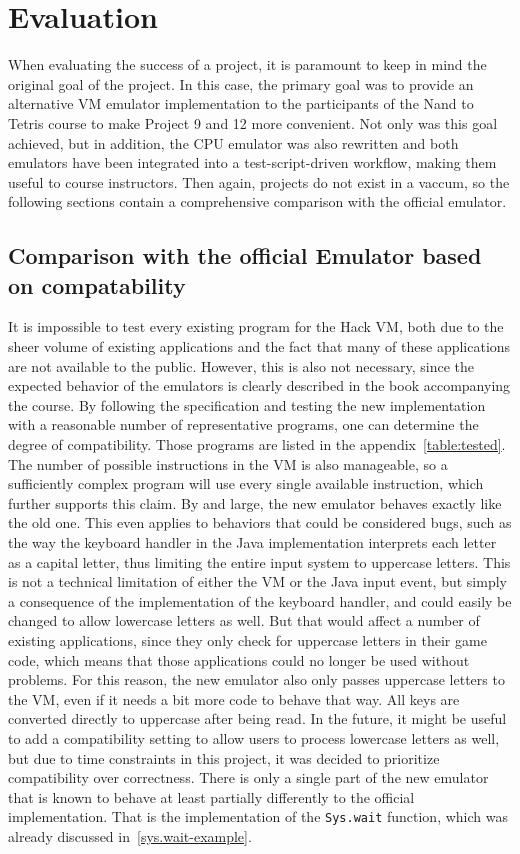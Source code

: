 \section{Evaluation} \label{evaluation}
When evaluating the success of a project, it is paramount to keep in mind the original goal of the project.
In this case, the primary goal was to provide an alternative VM emulator implementation to the participants of the Nand to Tetris course to make Project 9 and 12 more convenient.
Not only was this goal achieved, but in addition, the CPU emulator was also rewritten and both emulators have been integrated into a test-script-driven workflow, making them useful to course instructors.
Then again, projects do not exist in a vaccum, so the following sections contain a comprehensive comparison with the official emulator.

\subsection{Comparison with the official Emulator based on compatability} \label{compatibility}
It is impossible to test every existing program for the Hack VM, both due to the sheer volume of existing applications and the fact that many of these applications are not available to the public.
However, this is also not necessary, since the expected behavior of the emulators is clearly described in the book accompanying the course.
By following the specification and testing the new implementation with a reasonable number of representative programs, one can determine the degree of compatibility.
Those programs are listed in the appendix~\ref{table:tested}.
The number of possible instructions in the VM is also manageable, so a sufficiently complex program will use every single available instruction, which further supports this claim.
By and large, the new emulator behaves exactly like the old one.
This even applies to behaviors that could be considered bugs, such as the way the keyboard handler in the Java implementation interprets each letter as a capital letter, thus limiting the entire input system to uppercase letters.
This is not a technical limitation of either the VM or the Java input event, but simply a consequence of the implementation of the keyboard handler, and could easily be changed to allow lowercase letters as well.
But that would affect a number of existing applications, since they only check for uppercase letters in their game code, which means that those applications could no longer be used without problems.
For this reason, the new emulator also only passes uppercase letters to the VM, even if it needs a bit more code to behave that way.
All keys are converted directly to uppercase after being read.
In the future, it might be useful to add a compatibility setting to allow users to process lowercase letters as well, but due to time constraints in this project, it was decided to prioritize compatibility over correctness.
There is only a single part of the new emulator that is known to behave at least partially differently to the official implementation.
That is the implementation of the \verb+Sys.wait+ function, which was already discussed in~\cref{sys.wait-example}.

